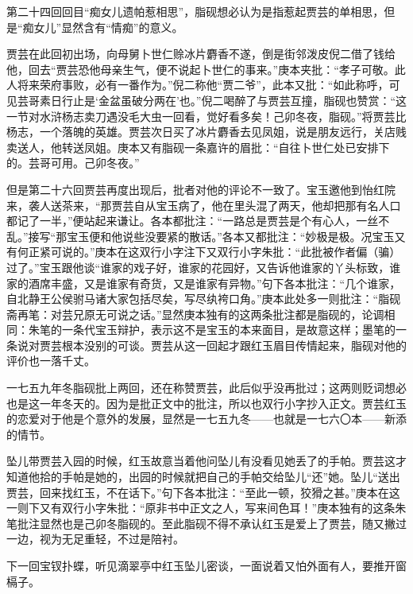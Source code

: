 \par 第二十四回回目“痴女儿遗帕惹相思”，脂砚想必认为是指惹起贾芸的单相思，但是“痴女儿”显然含有“情痴”的意义。
\par 贾芸在此回初出场，向母舅卜世仁赊冰片麝香不遂，倒是街邻泼皮倪二借了钱给他，回去“贾芸恐他母亲生气，便不说起卜世仁的事来。”庚本夹批：“孝子可敬。此人将来荣府事败，必有一番作为。”倪二称他“贾二爷”，此本又批：“如此称呼，可见芸哥素日行止是‘金盆虽破分两在’也。”倪二喝醉了与贾芸互撞，脂砚也赞赏：“这一节对水浒杨志卖刀遇没毛大虫一回看，觉好看多矣！己卯冬夜，脂砚。”将贾芸比杨志，一个落魄的英雄。贾芸次日买了冰片麝香去见凤姐，说是朋友远行，关店贱卖送人，他转送凤姐。庚本又有脂砚一条嘉许的眉批：“自往卜世仁处已安排下的。芸哥可用。己卯冬夜。”
\par 但是第二十六回贾芸再度出现后，批者对他的评论不一致了。宝玉邀他到怡红院来，袭人送茶来，“那贾芸自从宝玉病了，他在里头混了两天，他却把那有名人口都记了一半，”便站起来谦让。各本都批注：“一路总是贾芸是个有心人，一丝不乱。”接写“那宝玉便和他说些没要紧的散话。”各本又都批注：“妙极是极。况宝玉又有何正紧可说的。”庚本在这双行小字注下又双行小字朱批：“此批被作者偏（骗）过了。”宝玉跟他谈“谁家的戏子好，谁家的花园好，又告诉他谁家的丫头标致，谁家的酒席丰盛，又是谁家有奇货，又是谁家有异物。”句下各本批注：“几个谁家，自北静王公侯驸马诸大家包括尽矣，写尽纨袴口角。”庚本此处多一则批注：“脂砚斋再笔：对芸兄原无可说之话。”显然庚本独有的这两条批注都是脂砚的，论调相同：朱笔的一条代宝玉辩护，表示这不是宝玉的本来面目，是故意这样；墨笔的一条说对贾芸根本没别的可谈。贾芸从这一回起才跟红玉眉目传情起来，脂砚对他的评价也一落千丈。
\par 一七五九年冬脂砚批上两回，还在称赞贾芸，此后似乎没再批过；这两则贬词想必也是这一年冬天的。因为是批正文中的批注，所以也双行小字抄入正文。贾芸红玉的恋爱对于他是个意外的发展，显然是一七五九冬——也就是一七六〇本——新添的情节。
\par 坠儿带贾芸入园的时候，红玉故意当着他问坠儿有没看见她丢了的手帕。贾芸这才知道他拾的手帕是她的，出园的时候就把自己的手帕交给坠儿“还”她。坠儿“送出贾芸，回来找红玉，不在话下。”句下各本批注：“至此一顿，狡猾之甚。”庚本在这一则下又有双行小字朱批：“原非书中正文之人，写来间色耳！”庚本独有的这条朱笔批注显然也是己卯冬脂砚的。至此脂砚不得不承认红玉是爱上了贾芸，随又撇过一边，视为无足重轻，不过是陪衬。
\par 下一回宝钗扑蝶，听见滴翠亭中红玉坠儿密谈，一面说着又怕外面有人，要推开窗槅子。
